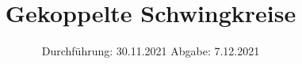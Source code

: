 

\subject{V355}
\title{Gekoppelte Schwingkreise}
\date{
  Durchführung: 30.11.2021
  \hspace{3em}
  Abgabe: 7.12.2021
}



\maketitle
\thispagestyle{empty}
\tableofcontents
\newpage






\printbibliography{}


